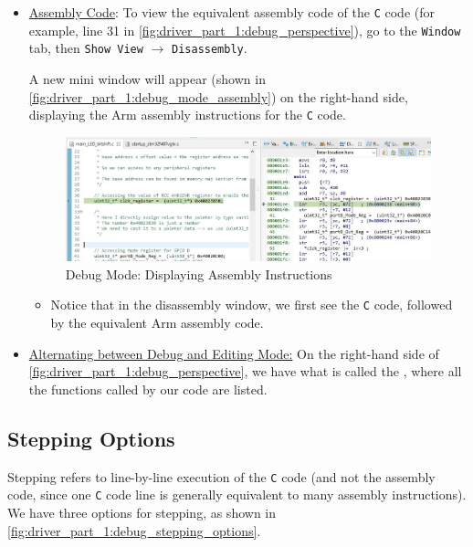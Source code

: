 \begin{itemize}
\item \underline{Assembly Code}: To view the equivalent assembly code of the \verb|C| code (for example, line 31 in \autoref{fig:driver_part_1:debug_perspective}), go to the \verb|Window| tab, then \verb|Show View| $\rightarrow$ \verb|Disassembly|.

A new mini window will appear (shown in \autoref{fig:driver_part_1:debug_mode_assembly}) on the right-hand side, displaying the Arm assembly instructions for the \verb|C| code.

\begin{figure}[h]
\centering
\includegraphics[scale=0.5]{Figures/driver_part_1/debug_mode_assembly}
\caption{Debug Mode: Displaying Assembly Instructions}
\label{fig:driver_part_1:debug_mode_assembly}
\end{figure}


    \begin{itemize}
        \item Notice that in the disassembly window, we first see the \verb|C| code, followed by the equivalent Arm assembly code.
    \end{itemize}

\item \underline{Alternating between Debug and Editing Mode:} On the right-hand side of \autoref{fig:driver_part_1:debug_perspective}, we have what is called the , where all the functions called by our code are listed.
    
\end{itemize}

\newpage
\subsection{Stepping Options}
\label{Sub:peripheral_dev_1:Stepping_Options}

Stepping refers to line-by-line execution of the \verb|C| code (and not the assembly code, since one \verb|C| code line is generally equivalent to many assembly instructions). We have three options for stepping, as shown in \autoref{fig:driver_part_1:debug_stepping_options}.

